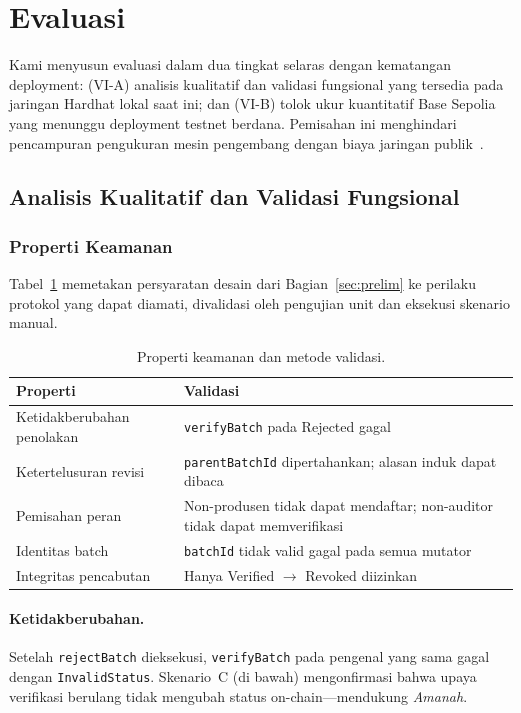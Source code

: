 \section{Evaluasi}
\label{sec:eval}

Kami menyusun evaluasi dalam dua tingkat selaras dengan kematangan deployment: (VI-A) analisis kualitatif dan validasi fungsional yang tersedia pada jaringan Hardhat lokal saat ini; dan (VI-B) tolok ukur kuantitatif Base Sepolia yang menunggu deployment testnet berdana.
Pemisahan ini menghindari pencampuran pengukuran mesin pengembang dengan biaya jaringan publik~\cite{casino2021systematic}.

\subsection{Analisis Kualitatif dan Validasi Fungsional}
\label{sec:eval-a}

\subsubsection{Properti Keamanan}
Tabel~\ref{tab:security} memetakan persyaratan desain dari Bagian~\ref{sec:prelim} ke perilaku protokol yang dapat diamati, divalidasi oleh pengujian unit dan eksekusi skenario manual.

\begin{table}[t]
  \caption{Properti keamanan dan metode validasi.}
  \label{tab:security}
  \centering
  \footnotesize
  \setlength{\tabcolsep}{3pt}
  \begin{tabularx}{\columnwidth}{@{}>{\raggedright\arraybackslash}p{}X@{}}
    \toprule
    \textbf{Properti} & \textbf{Validasi} \\
    \midrule
    Ketidakberubahan penolakan & \texttt{verifyBatch} pada Rejected gagal \\
    Ketertelusuran revisi & \texttt{parentBatchId} dipertahankan; alasan induk dapat dibaca \\
    Pemisahan peran & Non-produsen tidak dapat mendaftar; non-auditor tidak dapat memverifikasi \\
    Identitas batch & \texttt{batchId} tidak valid gagal pada semua mutator \\
    Integritas pencabutan & Hanya Verified $\rightarrow$ Revoked diizinkan \\
    \bottomrule
  \end{tabularx}
\end{table}

\paragraph{Ketidakberubahan.}
Setelah \texttt{rejectBatch} dieksekusi, \texttt{verifyBatch} pada pengenal yang sama gagal dengan \texttt{InvalidStatus}.
Skenario~C (di bawah) mengonfirmasi bahwa upaya verifikasi berulang tidak mengubah status on-chain---mendukung \emph{Amanah}.

